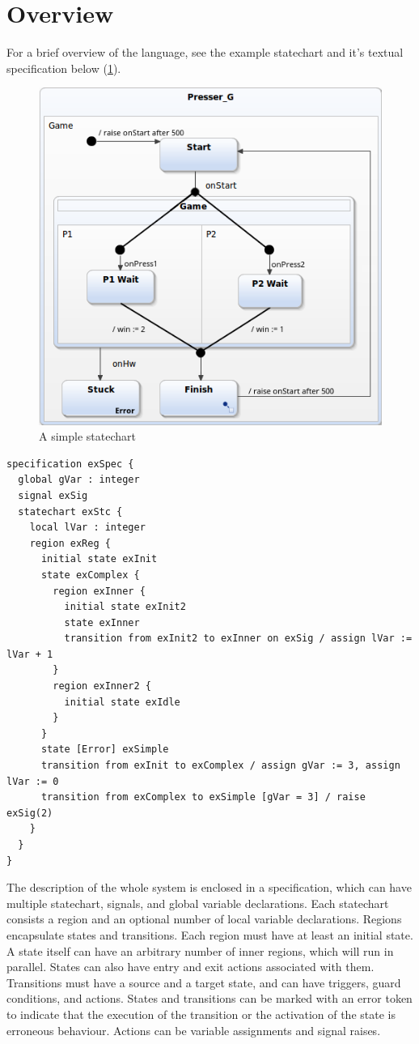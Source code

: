 \section{Overview}
For a brief overview of the language, see the example statechart and it's textual specification below (\cref{fig:verif}).
\begin{figure}[H]
	\centering
	\includegraphics[width=0.65\linewidth]{include/figures/chapter_4/stcex}
	\caption{A simple statechart}
	\label{fig:verif}
\end{figure}
\begin{lstlisting}
specification exSpec {
  global gVar : integer
  signal exSig
  statechart exStc {
    local lVar : integer
    region exReg {
      initial state exInit
      state exComplex {
        region exInner {
          initial state exInit2
          state exInner
          transition from exInit2 to exInner on exSig / assign lVar := lVar + 1
        }
        region exInner2 {
          initial state exIdle
        }
      }
      state [Error] exSimple
      transition from exInit to exComplex / assign gVar := 3, assign lVar := 0
      transition from exComplex to exSimple [gVar = 3] / raise exSig(2)
    }
  }
}
\end{lstlisting}
The description of the whole system is enclosed in a specification, which can have multiple statechart, signals, and global variable declarations. Each statechart consists a region and an optional number of local variable declarations. Regions encapsulate states and transitions. Each region must have at least an initial state. A state itself can have an arbitrary number of inner regions, which will run in parallel. States can also have entry and exit actions associated with them. Transitions must have a source and a target state, and can have triggers, guard conditions, and actions. States and transitions can be marked with an error token to indicate that the execution of the transition or the activation of the state is erroneous behaviour. Actions can be variable assignments and signal raises.
